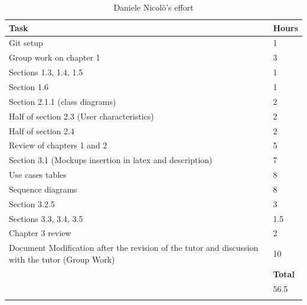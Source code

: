 \documentclass[titlepage]{article}
\begin{document}
	
	
	\begin{longtable}{| p{12 cm} | p{2 cm} |} 
		\hline
		{\bf Task} & {\bf Hours}\\
		\hline
		 Git setup & 1 \\
		 Group work on chapter 1 & 3 \\
		 Sections 1.3, 1.4, 1.5 & 1 \\
		 Section 1.6 & 1 \\
		 Section 2.1.1 (class diagrams) & 2\\ 
		 Half of section 2.3 (User characteristics) & 2 \\
		 Half of section 2.4 & 2 \\
		 Review of chapters 1 and 2 & 5 \\
		 Section 3.1 (Mockups insertion in latex and description) & 7\\
		 Use cases tables & 8 \\
		 Sequence diagrams & 8 \\
		 Section 3.2.5 & 3 \\
		 Sections 3.3, 3.4, 3.5 & 1.5 \\
		 Chapter 3 review & 2 \\
		 Document Modification after the revision of the
		 tutor and discussion with the tutor (Group Work) & 10 \\
		\hline
		&  {\bf Total} \\
		\hline
		&  56.5 \\
		\hline
		\caption{Daniele Nicolò's effort}
	\end{longtable}
\end{document}
